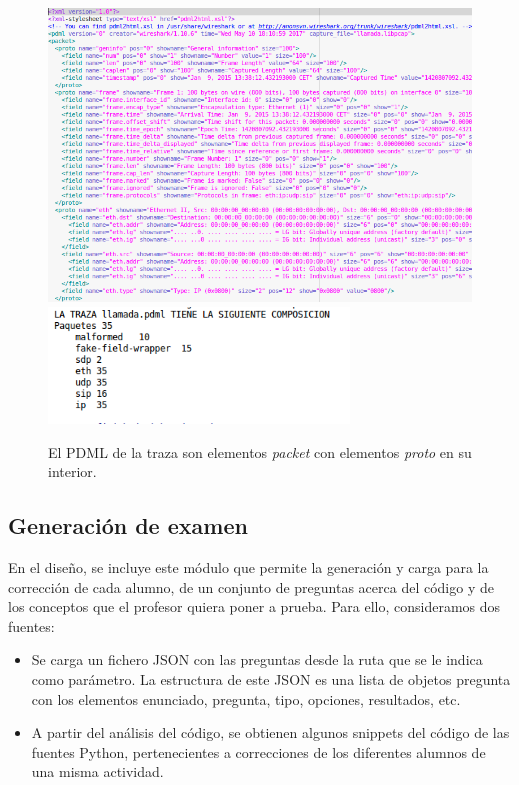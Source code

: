 \begin{figure}[H]
   \centering
   \includegraphics[width=15cm]{img/Selection_015_pdml_1}
   \includegraphics[width=8cm]{img/Selection_029_pdml}
   \caption{El PDML de la traza son elementos \textit{packet} con elementos \textit{proto} en su interior.}
   \label{figura:pdml}
\end{figure}


\newpage

\subsection{Generación de examen}

En el diseño, se incluye este módulo que permite la generación y carga para la corrección de cada alumno, de un conjunto de preguntas acerca del código y de los conceptos que el profesor quiera poner a prueba. Para ello, consideramos dos fuentes:

\begin{itemize}
\item Se carga un fichero JSON con las preguntas desde la ruta que se le indica como parámetro. La estructura de este JSON es una lista de objetos pregunta con los elementos enunciado, pregunta, tipo, opciones, resultados, etc.

\item A partir del análisis del código, se obtienen  algunos snippets del código de las fuentes Python, pertenecientes a correcciones de los diferentes alumnos de una misma actividad.
\end{itemize}


